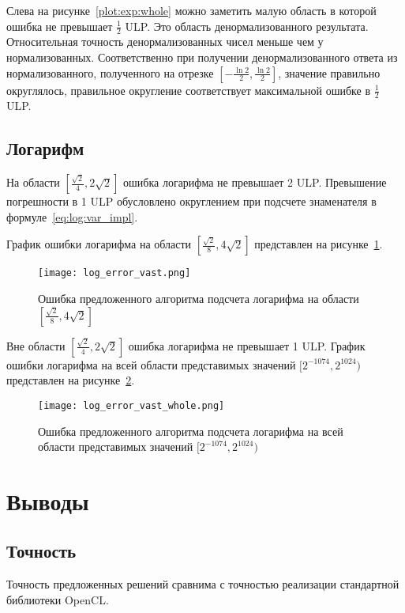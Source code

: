 Слева на рисунке~\ref{plot:exp:whole} можно заметить малую область в которой ошибка не превышает $\frac{1}{2}$ ULP.
Это область денормализованного результата.
Относительная точность денормализованных чисел меньше чем у нормализованных.
Соответственно при получении денормализованного ответа из нормализованного, полученного на отрезке $[-\frac{\ln{2}}{2}, \frac{\ln{2}}{2}]$, значение правильно округлялось, правильное округление соответствует максимальной ошибке в $\frac{1}{2}$ ULP.

\subsection{Логарифм}

На области $[\frac{\sqrt{2}}{4}, 2\sqrt{2}]$ ошибка логарифма не превышает 2 ULP.
Превышение погрешности в 1 ULP обусловлено округлением при подсчете знаменателя в формуле~\ref{eq:log:var_impl}.

График ошибки логарифма на области $[\frac{\sqrt{2}}{8}, 4\sqrt{2}]$ представлен на рисунке~\ref{plot:log:small}.

\begin{figure}[hbt]
    \centering
    \texttt{[image: log\_error\_vast.png]}
    \caption{Ошибка предложенного алгоритма подсчета логарифма на области $[\frac{\sqrt{2}}{8}, 4\sqrt{2}]$}
    \label{plot:log:small}
\end{figure}

Вне области $[\frac{\sqrt{2}}{4}, 2\sqrt{2}]$ ошибка логарифма не превышает 1 ULP.
График ошибки логарифма на всей области представимых значений $[2^{-1074}, 2^{1024})$ представлен на рисунке~\ref{plot:log:whole}.

\begin{figure}[hbt]
    \centering
    \texttt{[image: log\_error\_vast\_whole.png]}
    \caption{Ошибка предложенного алгоритма подсчета логарифма на всей области представимых значений $[2^{-1074}, 2^{1024})$}
    \label{plot:log:whole}
\end{figure}


\section{Выводы}

\subsection{Точность}

Точность предложенных решений сравнима с точностью реализации стандартной библиотеки OpenCL.

